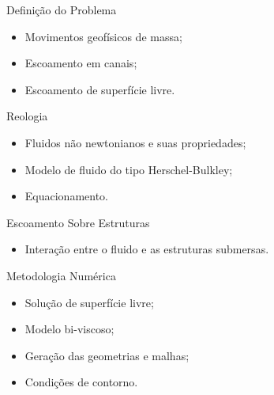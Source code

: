 \begin{frame}
    \begin{minipage}[c]{0.49\textwidth}
        \begin{exampleblock}{Definição do Problema}
            \begin{itemize}
                \item Movimentos geofísicos de massa;
                \item Escoamento em canais;
                \item Escoamento de superfície livre.
            \end{itemize}            
        \end{exampleblock}
        \hfill
        \pause
        \begin{exampleblock}{Reologia}
            \begin{itemize}
                \item Fluidos não newtonianos e suas propriedades; 
                \item Modelo de fluido do tipo Herschel-Bulkley;
                \item Equacionamento.
            \end{itemize}
        \end{exampleblock}
    \end{minipage}    
    \hfill
    \begin{minipage}[c]{0.49\textwidth}
        \pause
        \begin{exampleblock}{Escoamento Sobre Estruturas}
            \begin{itemize}
                \item Interação entre o fluido e as estruturas submersas.
            \end{itemize}
        \end{exampleblock}
        \hfill

        \pause
        \begin{exampleblock}{Metodologia Numérica}
            \begin{itemize}
                \item Solução de superfície livre;
                \item Modelo bi-viscoso;
                \item Geração das geometrias e malhas;
                \item Condições de contorno.
            \end{itemize}    
        \end{exampleblock}
    \end{minipage}
\end{frame}
